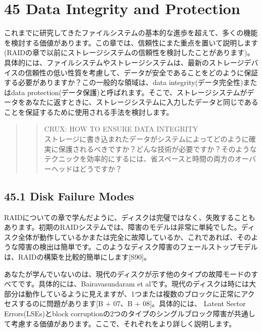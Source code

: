 \newpage

\hypertarget{data-integrity-and-protection}{%
\section*{45 Data Integrity and
Protection}\label{data-integrity-and-protection}}

これまでに研究してきたファイルシステムの基本的な進歩を超えて、多くの機能を検討する価値があります。この章では、信頼性にまた重点を置いて説明します(RAIDの章で以前にストレージシステムの信頼性を検討したことがあります)。具体的には、ファイルシステムやストレージシステムは、最新のストレージデバイスの信頼性の低い性質を考慮して、データが安全であることをどのように保証する必要がありますか？この一般的な領域は、data
integrity(データ完全性)またはdata
protection(データ保護)と呼ばれます。そこで、ストレージシステムがデータをあなたに返すときに、ストレージシステムに入力したデータと同じであることを保証するために使用される手法を検討します。

\begin{quote}
\begin{quote}
CRUX: HOW TO ENSURE DATA INTEGRITY\\
ストレージに書き込まれたデータがシステムによってどのように確実に保護されるべきですか？どんな技術が必要ですか？そのようなテクニックを効率的にするには、省スペースと時間の両方のオーバーヘッドはどうですか？
\end{quote}
\end{quote}

\hypertarget{disk-failure-modes}{%
\subsection*{45.1 Disk Failure Modes}\label{disk-failure-modes}}

RAIDについての章で学んだように、ディスクは完璧ではなく、失敗することもあります。初期のRAIDシステムでは、障害のモデルは非常に単純でした。ディスク全体が動作しているかまたは完全に故障しているか、これであれば、そのような障害の検出は簡単です。このようなディスク障害のフェールストップモデルは、RAIDの構築を比較的簡単にします{[}S90{]}。

あなたが学んでいないのは、現代のディスクが示す他のタイプの故障モードのすべてです。具体的には、Bairavasundaram
et
alです。現代のディスクは時には大部分は動作しているように見えますが、1つまたは複数のブロックに正常にアクセスするのに問題があります{[}B
+ 07、B + 08{]}。具体的には、 Latent Sector Errors(LSEs)とblock
corruptionの2つのタイプのシングルブロック障害が共通して考慮する価値があります。ここで、それぞれをより詳しく説明します。

